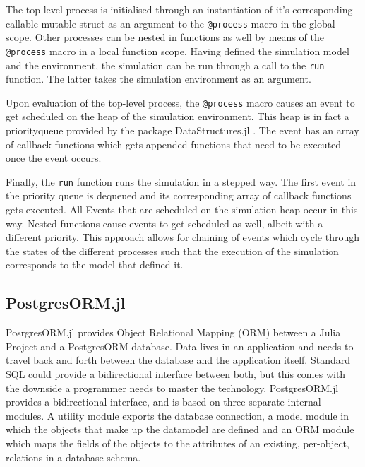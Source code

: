 \documentclass{juliacon}
\begin{document}
The top-level process is initialised through an instantiation of it's corresponding callable mutable struct as an argument to the \texttt{@process} macro in the global scope. Other processes can be nested in functions as well by means of the \texttt{@process} macro in a local function scope. Having defined the simulation model and the environment, the simulation can be run through a call to the \texttt{run} function. The latter takes the simulation environment as an argument. \vskip 6pt

Upon evaluation of the top-level process, the \texttt{@process} macro causes an event to get scheduled on the heap of the simulation environment. This heap is in fact a priorityqueue provided by the package DataStructures.jl \cite{todo}. The event has an array of callback functions which gets appended functions that need to be executed once the event occurs. \vskip 6pt

Finally, the \texttt{run} function runs the simulation in a stepped way. The first event in the priority queue is dequeued and its corresponding array of callback functions gets executed. All Events that are scheduled on the simulation heap occur in this way. Nested functions cause events to get scheduled as well, albeit with a different priority. This approach allows for chaining of events which cycle through the states of the different processes such that the execution of the simulation corresponds to the model that defined it. \vskip 6pt

\subsection{PostgresORM.jl}

PosrgresORM.jl provides Object Relational Mapping (ORM) between a Julia Project and a PostgresORM database. Data lives in an application and needs to travel back and forth between the database and the application itself. Standard SQL could provide a bidirectional interface between both, but this comes with the downside a programmer needs to master the technology. PostgresORM.jl provides a bidirectional interface, and is based on three separate internal modules. A utility module exports the database connection, a model module in which the objects that make up the datamodel are defined and an ORM module which maps the fields of the objects to the attributes of an existing, per-object, relations in a database schema. \vskip 6pt
\end{document}
